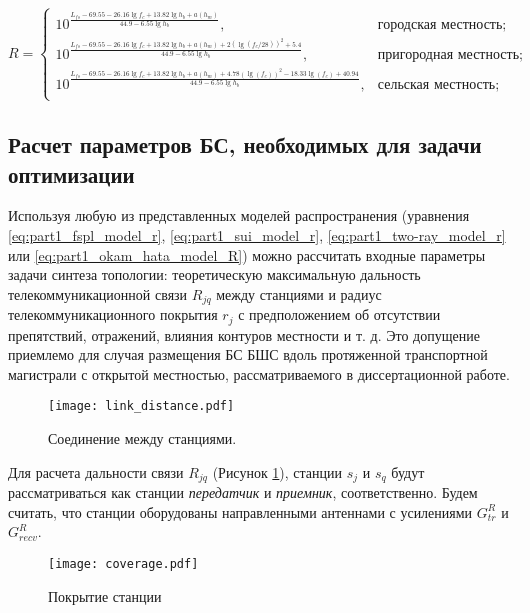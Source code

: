 \begin{equation}
  \label{eq:part1_okam_hata_model_R}
  R = 
  \begin{cases}
    10^\frac{L_{fs} - 69.55 - 26.16\lg{f_c} + 13.82\lg{h_b} + a(h_m)}{44.9 - 6.55 \lg{h_b}}, & \text{городская местность};\\

    10^\frac{L_{fs} - 69.55 - 26.16\lg{f_c} + 13.82\lg{h_b} + a(h_m) + 2(\lg(f_c/28))^2 + 5.4 }{44.9 - 6.55 \lg{h_b}}, & \text{пригородная местность};\\

    10^\frac{L_{fs} - 69.55 - 26.16\lg{f_c} + 13.82\lg{h_b} + a(h_m) + 4.78(\lg(f_c))^2 - 18.33\lg(f_c) + 40.94 }{44.9 - 6.55 \lg{h_b}}, & \text{сельская местность};\\
  \end{cases}
\end{equation}

\subsection{Расчет параметров БС, необходимых для задачи оптимизации}

Используя любую из представленных моделей распространения (уравнения \cref{eq:part1_fspl_model_r}, \cref{eq:part1_sui_model_r}, \cref{eq:part1_two-ray_model_r}  или \cref{eq:part1_okam_hata_model_R}) можно рассчитать входные параметры задачи синтеза топологии: теоретическую максимальную дальность телекоммуникационной связи $ R_{jq}$ между станциями и радиус телекоммуникационного покрытия $ r_j $ с предположением об отсутствии препятствий, отражений, влияния контуров местности и т. д. Это допущение приемлемо для случая размещения БС БШС вдоль протяженной транспортной магистрали с открытой местностью, рассматриваемого в диссертационной работе.

\begin{figure}[h!]
  \centering
   \texttt{[image: link\_distance.pdf]}
\caption{Соединение между станциями.}
\label{fig:part3_link_distance}
\end{figure}

Для расчета дальности связи $R_{jq}$ (Рисунок \cref{fig:part3_link_distance}), станции $s_j$ и $s_q$ будут рассматриваться как станции \textit{передатчик} и \textit{приемник}, соответственно. Будем считать, что станции оборудованы направленными антеннами с усилениями $G_{tr}^{R}$ и $G_{recv}^{R}$.

\begin{figure}[h!]
  \centering
   \texttt{[image: coverage.pdf]}
\caption{Покрытие станции}
\label{fig:part3_coverage}
\end{figure}

